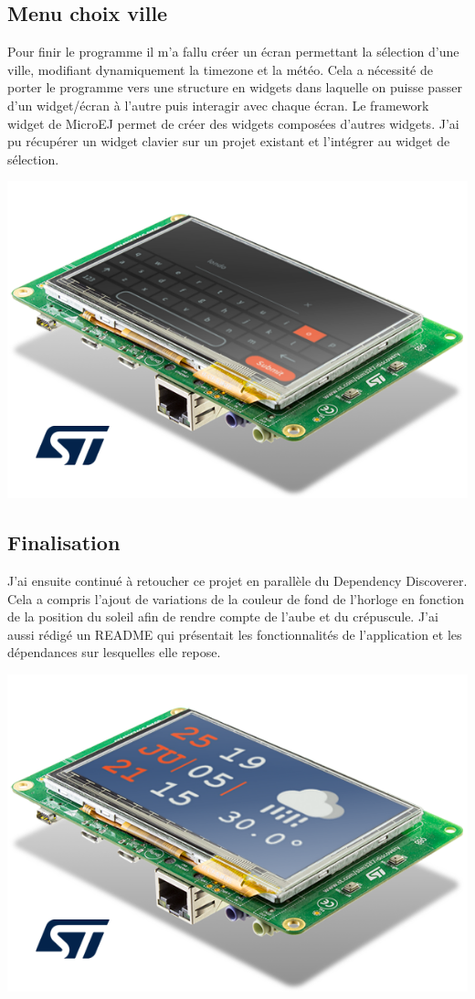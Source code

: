 \documentclass[french,a4paper,12pt]{report}
\begin{document}
\subsection{Menu choix ville}

Pour finir le programme il m’a fallu créer un écran permettant la sélection d’une ville, modifiant dynamiquement la timezone et la météo. Cela a nécessité de porter le programme vers une structure en widgets dans laquelle on puisse passer d’un widget/écran à l’autre puis interagir avec chaque écran.
Le framework widget de MicroEJ permet de créer des widgets composées d’autres widgets. J'ai pu récupérer un widget clavier sur un projet existant et l’intégrer au widget de sélection. 

\begin{center}
\includegraphics[width=.5\textwidth]{./ressources/schemas/inSituationSel.png}
\end{center}

\subsection{Finalisation}

J'ai ensuite continué à retoucher ce projet en parallèle du Dependency Discoverer. Cela a compris l'ajout de variations de la couleur de fond de l'horloge en fonction de la position du soleil afin de rendre compte de l'aube et du crépuscule. J'ai aussi rédigé un README qui présentait les fonctionnalités de l'application et les dépendances sur lesquelles elle repose.

\begin{center}
\includegraphics[width=.5\textwidth]{./ressources/schemas/inSituationFin.png}
\end{center}
\end{document}
